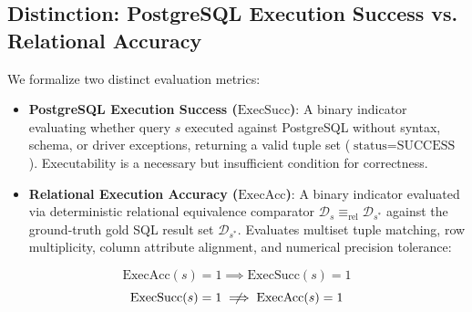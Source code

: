 \subsection{Distinction: PostgreSQL Execution Success vs. Relational Accuracy}
We formalize two distinct evaluation metrics:
\begin{itemize}
    \item \textbf{PostgreSQL Execution Success ($\text{ExecSucc}$)}: A binary indicator evaluating whether query $s$ executed against PostgreSQL without syntax, schema, or driver exceptions, returning a valid tuple set ($\text{status} = \text{SUCCESS}$). Executability is a necessary but insufficient condition for correctness.
    \item \textbf{Relational Execution Accuracy ($\text{ExecAcc}$)}: A binary indicator evaluated via deterministic relational equivalence comparator $\mathcal{D}_s \equiv_{\text{rel}} \mathcal{D}_{s^*}$ against the ground-truth gold SQL result set $\mathcal{D}_{s^*}$. Evaluates multiset tuple matching, row multiplicity, column attribute alignment, and numerical precision tolerance:
\end{itemize}
\begin{equation}
\text{ExecAcc}(s) = 1 \implies \text{ExecSucc}(s) = 1
\end{equation}
\begin{equation}
\text{ExecSucc}(s) = 1 \centernot\implies \text{ExecAcc}(s) = 1
\end{equation}

